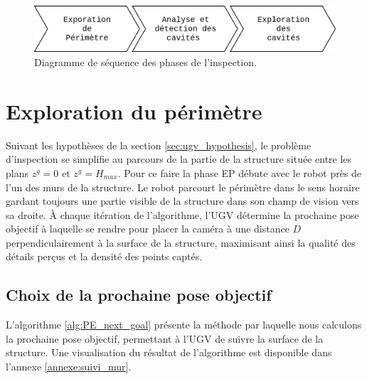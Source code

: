 \begin{figure}[h]
  \centering
  \includegraphics[width=0.75\linewidth]{images/flowchart}
  \caption[Diagramme de séquence]{Diagramme de séquence des phases de l'inspection.}
\end{figure}

\section{Exploration du périmètre} \label{sec:perimeter_exploration}

Suivant les hypothèses de la section \ref{sec:ugv_hypothesis}, le problème d'inspection se simplifie au parcours de la partie de la structure située entre les plans $z^g = 0$ et $z^g = H_{max}$. Pour ce faire la phase EP débute avec le robot près de l'un des murs de la structure. Le robot parcourt le périmètre dans le sens horaire gardant toujours une partie visible de la structure dans son champ de vision vers sa droite. À chaque itération de l'algorithme, l'UGV détermine la prochaine pose objectif à laquelle se rendre pour placer la caméra à une distance $D$ perpendiculairement à la surface de la structure, maximisant ainsi la qualité des détails perçus et la densité des points captés.

\subsection{Choix de la prochaine pose objectif}

L'algorithme \ref{alg:PE_next_goal} présente la méthode par laquelle nous calculons la prochaine pose objectif, permettant à l'UGV de suivre la surface de la structure. Une visualisation du résultat de l'algorithme est disponible dans l'annexe \ref{annexe:suivi_mur}.

